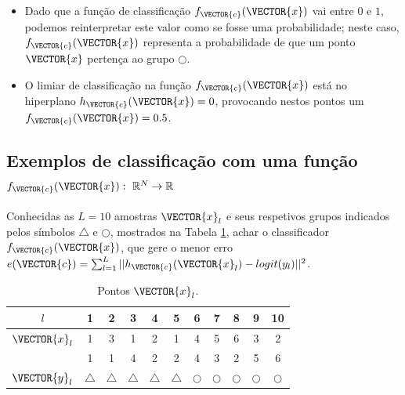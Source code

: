 \begin{tcbattention}
\begin{itemize}
\item Dado que a função de classificação $f_{\VECTOR{c}}(\VECTOR{x})$ vai entre $0$ e $1$,
podemos reinterpretar este valor como se fosse uma probabilidade;
neste caso, $f_{\VECTOR{c}}(\VECTOR{x})$ representa a probabilidade de que um ponto $\VECTOR{x}$
pertença ao grupo $\bigcirc$.
\item O limiar de classificação na função $f_{\VECTOR{c}}(\VECTOR{x})$ está no hiperplano $h_{\VECTOR{c}}(\VECTOR{x})=0$,
provocando nestos pontos um $f_{\VECTOR{c}}(\VECTOR{x})=0.5$.
\end{itemize}
\end{tcbattention}



\subsection{Exemplos de classificação com uma função
$f_{\VECTOR{c}}(\VECTOR{x}):~\mathbb{R}^N \rightarrow \mathbb{R}$ }

\begin{example}\label{ex:theo:reglogrnr1}
Conhecidas as $L=10$ amostras $\VECTOR{x}_l$ e seus respetivos grupos indicados pelos símbolos $\bigtriangleup$ e $\bigcirc$, 
mostrados na Tabela \ref{table:theo:reglogrnr1:xn},
achar o classificador $f_{\VECTOR{c}}(\VECTOR{x})$, 
que gere o menor erro $e(\VECTOR{c}) =  \sum_{l=1}^{L} ||h_{\VECTOR{c}}(\VECTOR{x}_l)-logit(y_l)||^2$.
\end{example}


\begin{table}[h!]
\centering
\begin{tabular}{|c||c|c|c|c|c||c|c|c|c|c||} 
 \hline
$l$            & 1 & 2 & 3 & 4 & 5 & 6 & 7 & 8 & 9 & 10 \\ \hline \hline
$\VECTOR{x}_l$ & 1 & 3 & 1 & 2 & 1 & 4 & 5 & 6 & 3 & 2 \\ 
~              & 1 & 1 & 4 & 2 & 2 & 4 & 3 & 2 & 5 & 6 \\ \hline
$\VECTOR{y}_l$ & $\bigtriangleup$ & $\bigtriangleup$ & $\bigtriangleup$ & $\bigtriangleup$ & $\bigtriangleup$ 
      & $\bigcirc$ & $\bigcirc$ & $\bigcirc$ & $\bigcirc$ & $\bigcirc$\\ \hline
\end{tabular}
\caption{Pontos $\VECTOR{x}_l$.}
\label{table:theo:reglogrnr1:xn}
\end{table}


